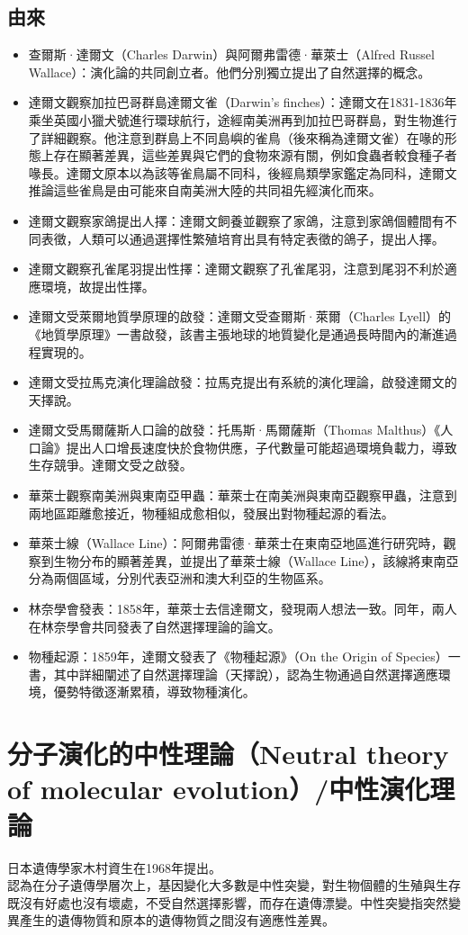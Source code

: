 \documentclass[a4paper,12pt]{report}
\begin{document}
\subsection{由來}
\begin{itemize}
\item 查爾斯·達爾文（Charles Darwin）與阿爾弗雷德·華萊士（Alfred Russel Wallace）：演化論的共同創立者。他們分別獨立提出了自然選擇的概念。
\item 達爾文觀察加拉巴哥群島達爾文雀（Darwin's finches）：達爾文在1831-1836年乘坐英國小獵犬號進行環球航行，途經南美洲再到加拉巴哥群島，對生物進行了詳細觀察。他注意到群島上不同島嶼的雀鳥（後來稱為達爾文雀）在喙的形態上存在顯著差異，這些差異與它們的食物來源有關，例如食蟲者較食種子者喙長。達爾文原本以為該等雀鳥屬不同科，後經鳥類學家鑑定為同科，達爾文推論這些雀鳥是由可能來自南美洲大陸的共同祖先經演化而來。
\item 達爾文觀察家鴿提出人擇：達爾文飼養並觀察了家鴿，注意到家鴿個體間有不同表徵，人類可以通過選擇性繁殖培育出具有特定表徵的鴿子，提出人擇。
\item 達爾文觀察孔雀尾羽提出性擇：達爾文觀察了孔雀尾羽，注意到尾羽不利於適應環境，故提出性擇。
\item 達爾文受萊爾地質學原理的啟發：達爾文受查爾斯·萊爾（Charles Lyell）的《地質學原理》一書啟發，該書主張地球的地質變化是通過長時間內的漸進過程實現的。
\item 達爾文受拉馬克演化理論啟發：拉馬克提出有系統的演化理論，啟發達爾文的天擇說。
\item 達爾文受馬爾薩斯人口論的啟發：托馬斯·馬爾薩斯（Thomas Malthus）《人口論》提出人口增長速度快於食物供應，子代數量可能超過環境負載力，導致生存競爭。達爾文受之啟發。
\item 華萊士觀察南美洲與東南亞甲蟲：華萊士在南美洲與東南亞觀察甲蟲，注意到兩地區距離愈接近，物種組成愈相似，發展出對物種起源的看法。
\item 華萊士線（Wallace Line）：阿爾弗雷德·華萊士在東南亞地區進行研究時，觀察到生物分布的顯著差異，並提出了華萊士線（Wallace Line），該線將東南亞分為兩個區域，分別代表亞洲和澳大利亞的生物區系。
\item 林奈學會發表：1858年，華萊士去信達爾文，發現兩人想法一致。同年，兩人在林奈學會共同發表了自然選擇理論的論文。
\item 物種起源：1859年，達爾文發表了《物種起源》（On the Origin of Species）一書，其中詳細闡述了自然選擇理論（天擇說），認為生物通過自然選擇適應環境，優勢特徵逐漸累積，導致物種演化。
\end{itemize}
\section{分子演化的中性理論（Neutral theory of molecular evolution）/中性演化理論}
日本遺傳學家木村資生在1968年提出。\\
認為在分子遺傳學層次上，基因變化大多數是中性突變，對生物個體的生殖與生存既沒有好處也沒有壞處，不受自然選擇影響，而存在遺傳漂變。中性突變指突然變異產生的遺傳物質和原本的遺傳物質之間沒有適應性差異。
\end{document}
